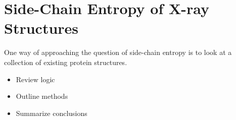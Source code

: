 \section*{Side-Chain Entropy of X-ray Structures}
\label{sec:side_chain_entropy_of_x_ray_structures}
One way of approaching the question of side-chain entropy is to look at a collection of existing protein structures.
\begin{itemize}
	\item Review logic
	\item Outline methods
	\item Summarize conclusions
\end{itemize}

